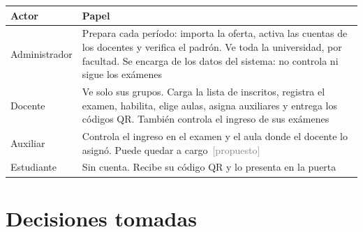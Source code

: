 \documentclass[11pt,letterpaper]{article}
\newcommand{\propuesto}{\textcolor{gray}{\footnotesize\,[propuesto]}}
\begin{document}
\begin{center}
\begin{tabular}{@{}L{3.4cm}L{12.4cm}@{}}
\hline
\textbf{Actor} & \textbf{Papel} \\
\hline
Administrador & Prepara cada período: importa la oferta, activa las cuentas de los docentes y verifica el padrón. Ve toda la universidad, por facultad. Se encarga de los datos del sistema: no controla ni sigue los exámenes \\
Docente & Ve solo sus grupos. Carga la lista de inscritos, registra el examen, habilita, elige aulas, asigna auxiliares y entrega los códigos QR. También controla el ingreso de sus exámenes \\
Auxiliar & Controla el ingreso en el examen y el aula donde el docente lo asignó. Puede quedar a cargo \propuesto \\
Estudiante & Sin cuenta. Recibe su código QR y lo presenta en la puerta \\
\hline
\end{tabular}
\end{center}

\section{Decisiones tomadas}
\end{document}
